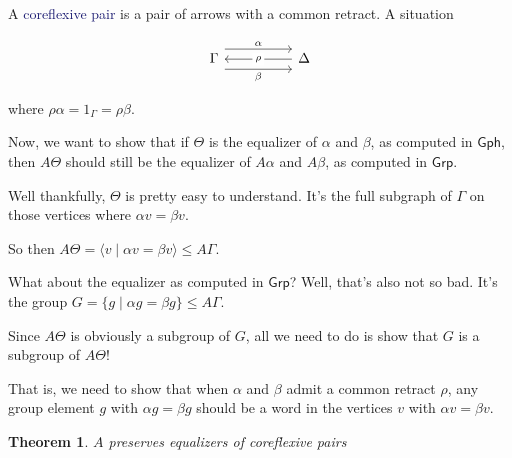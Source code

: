 \documentclass[12pt]{article}
\newtheorem{thm}{Theorem}
\theoremstyle{definition}
\theoremstyle{theorem}
\newcommand*{\important}[1]{\textcolor{MidnightBlue}{#1}}
\begin{document}
A \important{coreflexive pair} is a pair of arrows with a common retract. 
A situation

\[\begin{tikzcd}
	\Gamma && \Delta
	\arrow["\alpha", shift left=3, from=1-1, to=1-3]
	\arrow["\beta"', shift right=3, from=1-1, to=1-3]
	\arrow["\rho"{description}, from=1-3, to=1-1]
\end{tikzcd}\]

where $\rho \alpha = 1_\Gamma = \rho \beta$.

Now, we want to show that if $\Theta$ is the equalizer of $\alpha$ and $\beta$,
as computed in $\mathsf{Gph}$, 
then $A\Theta$ should still be the equalizer of $A \alpha$ and $A \beta$, 
as computed in $\mathsf{Grp}$.

Well thankfully, $\Theta$ is pretty easy to understand. It's the full subgraph
of $\Gamma$ on those vertices where $\alpha v = \beta v$.

So then $A\Theta = \langle v \mid \alpha v = \beta v \rangle \leq A \Gamma$.

What about the equalizer as computed in $\mathsf{Grp}$? Well, that's also not
so bad. It's the group $G = \{ g \mid \alpha g = \beta g \} \leq A\Gamma$.

Since $A\Theta$ is obviously a subgroup of $G$, all we need to do is show that 
$G$ is a subgroup of $A\Theta$! 

That is, we need to show that when 
$\alpha$ and $\beta$ admit a common retract $\rho$,
any group element $g$ with $\alpha g = \beta g$ should be a word in the
vertices $v$ with $\alpha v =  \beta v$.

\begin{thm}
    $A$ preserves equalizers of coreflexive pairs
\end{thm}

\end{document}
